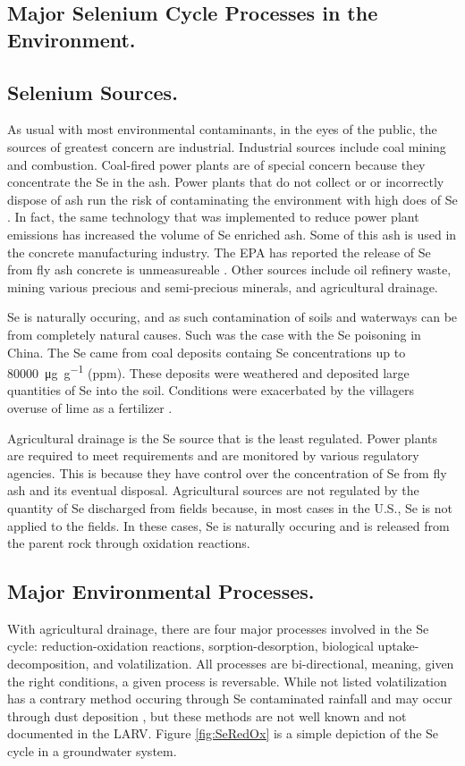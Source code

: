 \begin{linenumbers}[1]
\clearpage{}

\section{Major Selenium Cycle Processes in the Environment.}
\label{sec:major processes}

\subsection*{Selenium Sources.}
As usual with most environmental contaminants, in the eyes of the public, the sources of greatest concern are industrial.  Industrial sources include coal mining and combustion.  Coal-fired power plants are of special concern because they concentrate the Se in the ash.  Power plants that do not collect or or incorrectly dispose of ash run the risk of contaminating the environment with high does of Se \todoc.  In fact, the same technology that was implemented to reduce power plant emissions has increased the volume of Se enriched ash.  Some of this ash is used in the concrete manufacturing industry.  The EPA has reported the release of Se from fly ash concrete is unmeasureable \parencite{EPA2014}.  Other sources include oil refinery waste, mining various precious and semi-precious minerals, and agricultural drainage.

Se is naturally occuring, and as such contamination of soils and waterways can be from completely natural causes.  Such was the case with the Se poisoning in China.  The Se came from coal deposits containg Se concentrations up to \SI{80000}{\micro\gram\per\gram} (ppm).  These deposits were weathered and deposited large quantities of Se into the soil.   Conditions were exacerbated by the villagers overuse of lime as a fertilizer \parencite{yang1983}.

Agricultural drainage is the Se source that is the least regulated.  Power plants are required to meet requirements and are monitored by various regulatory agencies.  This is because they have control over the concentration of Se from fly ash and its eventual disposal.  Agricultural sources are not regulated by the quantity of Se discharged from fields because, in most cases in the U.S., Se is not applied to the fields.  In these cases, Se is naturally occuring and is released from the parent rock through oxidation reactions.  

\subsection*{Major Environmental Processes.}
With agricultural drainage, there are four major processes involved in the Se cycle: reduction-oxidation reactions, sorption-desorption, biological uptake-decomposition, and volatilization.  All processes are bi-directional, meaning, given the right conditions, a given process is reversable.  While not listed volatilization has a contrary method occuring through Se contaminated rainfall \todoc and may occur through dust deposition \todoc, but these methods are not well known and not documented in the LARV.  Figure \ref{fig:SeRedOx} is a simple depiction of the Se cycle in a groundwater system.


\end{linenumbers}
